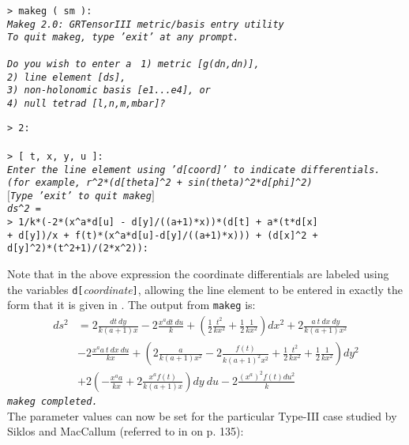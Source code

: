 \documentclass{article}
\begin{document}
{\noindent\texttt{> makeg ( sm ):\\
\indent\textsl{\small Makeg 2.0: GRTensorIII metric/basis entry utility\\
\indent To quit makeg, type 'exit' at any prompt.}}
\begin{tabbing}
\indent\texttt{\textsl{Do you wish to enter a }}
  \= \texttt{\textsl{1) metric [g(dn,dn)],}}\\
  \> \texttt{\textsl{2) line element [ds],}}\\
  \> \texttt{\textsl{3) non-holonomic basis [e1...e4], or}}\\
  \> \texttt{\textsl{4) null tetrad [l,n,m,mbar]?}}
\end{tabbing}
\texttt{> 2:\\
\\
> [ t, x, y, u ]:}\\

\texttt{\textsl{{\small Enter the line element using 'd[coord]' to indicate
  differentials.\\
\indent (for example,  r\^{}2*(d[theta]\^{}2 + sin(theta)\^{}2*d[phi]\^{}2)\\
\indent $[$Type 'exit' to quit makeg$]$\\
\indent  ds\^{}2 = }}}\\

\noindent\texttt{> 1/k*(-2*(x\^{}a*d[u] - d[y]/((a+1)*x))*(d[t]
  + a*(t*d[x] \\
\indent + d[y])/x + f(t)*(x\^{}a*d[u]-d[y]/((a+1)*x))) + (d[x]\^{}2 +\\
\indent d[y]\^{}2)*(t\^{}2+1)/(2*x\^{}2)):\\
}

\noindent Note that in the above expression the coordinate differentials
are labeled using the variables {\tt d[}{\em coordinate}{\tt ]},
allowing the line element to be entered in exactly the form that it is
given in \cite{krameretal}. The output from {\tt makeg} is:
\begin{align*}
  ds^2 & = 2\frac{dt\ dy}{k(a+1)x} - 2\frac{x^a dt\ du}{k}
    + \left(\frac{1}{2}\frac{t^2}{kx^2} + 
    \frac{1}{2}\frac{1}{kx^2}\right) dx^2
    + 2\frac{a\ t\ dx\ dy}{k(a+1)x^2}\\
  & - 2\frac{x^a a\ t\ dx\ du}{kx} + \left( 2\frac{a}{k(a+1)x^2}
    - 2\frac{f(t)}{k(a+1)^2 x^2} + \frac{1}{2}\frac{t^2}{kx^2} +
    \frac{1}{2}\frac{1}{kx^2}\right)dy^2\\
  & + 2\left(-\frac{x^a a}{kx} + 2\frac{x^a f(t)}{k(a+1)x}\right)dy\ du
    - 2\frac{(x^a)^2 f(t) du^2}{k}
\end{align*}
\indent\texttt{\textsl{\small makeg completed.}}\\
The parameter values can now be set for the particular Type-III case
studied by Siklos and MacCallum \cite{maccallum/siklos:1981} (referred
to in \cite{krameretal} on p. 135):\\

}
\end{document}
